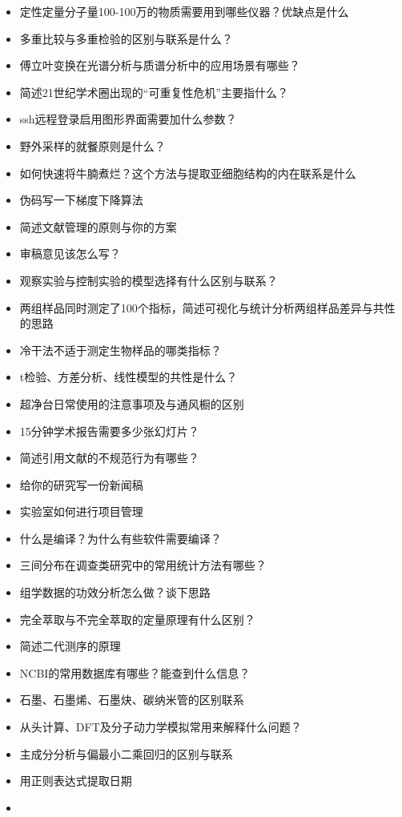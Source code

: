 \documentclass[]{tufte-book}
\begin{document}
\begin{itemize}
\item
  定性定量分子量100-100万的物质需要用到哪些仪器？优缺点是什么
\item
  多重比较与多重检验的区别与联系是什么？
\item
  傅立叶变换在光谱分析与质谱分析中的应用场景有哪些？
\item
  简述21世纪学术圈出现的``可重复性危机''主要指什么？
\item
  ssh远程登录启用图形界面需要加什么参数？
\item
  野外采样的就餐原则是什么？
\item
  如何快速将牛腩煮烂？这个方法与提取亚细胞结构的内在联系是什么
\item
  伪码写一下梯度下降算法
\item
  简述文献管理的原则与你的方案
\item
  审稿意见该怎么写？
\item
  观察实验与控制实验的模型选择有什么区别与联系？
\item
  两组样品同时测定了100个指标，简述可视化与统计分析两组样品差异与共性的思路
\item
  冷干法不适于测定生物样品的哪类指标？
\item
  t检验、方差分析、线性模型的共性是什么？
\item
  超净台日常使用的注意事项及与通风橱的区别
\item
  15分钟学术报告需要多少张幻灯片？
\item
  简述引用文献的不规范行为有哪些？
\item
  给你的研究写一份新闻稿
\item
  实验室如何进行项目管理
\item
  什么是编译？为什么有些软件需要编译？
\item
  三间分布在调查类研究中的常用统计方法有哪些？
\item
  组学数据的功效分析怎么做？谈下思路
\item
  完全萃取与不完全萃取的定量原理有什么区别？
\item
  简述二代测序的原理
\item
  NCBI的常用数据库有哪些？能查到什么信息？
\item
  石墨、石墨烯、石墨炔、碳纳米管的区别联系
\item
  从头计算、DFT及分子动力学模拟常用来解释什么问题？
\item
  主成分分析与偏最小二乘回归的区别与联系
\item
  用正则表达式提取日期
\item

\end{itemize}
\end{document}
